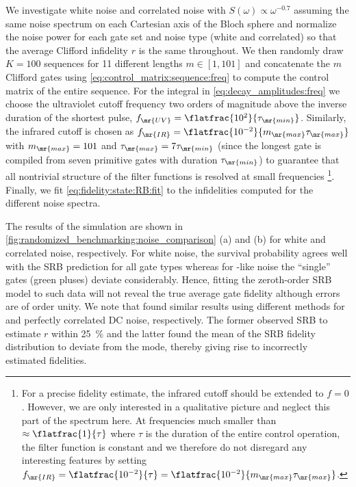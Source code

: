 We investigate white noise and correlated noise with $S(\omega)\propto\omega^{-0.7}$ assuming the same noise spectrum on each Cartesian axis of the Bloch sphere and normalize the noise power for each gate set and noise type (white and correlated) so that the average Clifford infidelity $r$ is the same throughout. We then randomly draw $K = \num{100}$ sequences for \num{11} different lengths $m\in[1, 101]$ and concatenate the $m$ Clifford gates using \cref{eq:control_matrix:sequence:freq} to compute the control matrix of the entire sequence. For the integral in \cref{eq:decay_amplitudes:freq} we choose the ultraviolet cutoff frequency two orders of magnitude above the inverse duration of the shortest pulse, $f_\mr{UV} = \flatfrac{10^2}{\tau_\mr{min}}$. Similarly, the infrared cutoff is chosen as $f_\mr{IR} = \flatfrac{10^{-2}}{m_\mr{max}\tau_\mr{max}}$ with $m_\mr{max} = 101$ and $\tau_\mr{max} = 7\tau_\mr{min}$ (since the longest gate is compiled from seven primitive gates with duration $\tau_\mr{min}$) to guarantee that all nontrivial structure of the filter functions is resolved at small frequencies
\footnote{For a precise fidelity estimate, the infrared cutoff should be extended to $f=0$. However, we are only interested in a qualitative picture and neglect this part of the spectrum here. At frequencies much smaller than $\approx\flatfrac{1}{\tau}$ where $\tau$ is the duration of the entire control operation, the filter function is constant and we therefore do not disregard any interesting features by setting $f_\mr{IR} = \flatfrac{10^{-2}}{\tau} = \flatfrac{10^{-2}}{m_\mr{max}\tau_\mr{max}}$.}.
Finally, we fit \cref{eq:fidelity:state:RB:fit} to the infidelities computed for the different noise spectra.

The results of the simulation are shown in \cref{fig:randomized_benchmarking:noise_comparison} (a) and (b) for white and correlated noise, respectively. For white noise, the survival probability agrees well with the SRB prediction for all gate types whereas for \oneoverf-like noise the \enquote{single} gates (green pluses) deviate considerably. Hence, fitting the zeroth-order SRB model to such data will not reveal the true average gate fidelity although errors are of order unity. We note that  found similar results using different methods for \oneoverf and perfectly correlated DC noise, respectively. The former observed SRB to estimate $r$ within \SI{25}{\percent} and the latter found the mean of the SRB fidelity distribution to deviate from the mode, thereby giving rise to incorrectly estimated fidelities.

